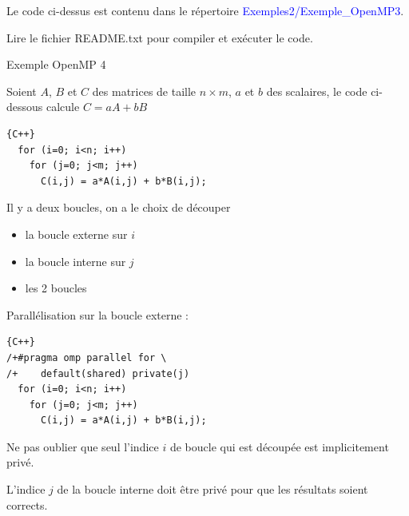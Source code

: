 \documentclass{beamer}
\begin{document}
\begin{frame}
	Le code ci-dessus est contenu dans le répertoire \textcolor{blue}{Exemples2/Exemple\_OpenMP3}.
	
	Lire le fichier README.txt pour compiler et exécuter le code.
		
\end{frame}

\begin{frame}[fragile]
	Exemple OpenMP 4
	
	\vfill	
	
	Soient $A$, $B$ et $C$ des matrices de taille $n\times m$, $a$ et $b$ des scalaires, le code ci-dessous calcule $C = a A + b B$
	
	\vfill

\begin{lstlisting}{C++}
  for (i=0; i<n; i++)
    for (j=0; j<m; j++)
      C(i,j) = a*A(i,j) + b*B(i,j);
\end{lstlisting}
	\vfill
	
	Il y a deux boucles, on a le choix de découper
	\begin{itemize}
		\item la boucle externe sur $i$
		\item la boucle interne sur $j$
		\item les 2 boucles
	\end{itemize}
\end{frame}

\begin{frame}[fragile]
Parallélisation sur la boucle externe :
	
	\begin{lstlisting}{C++}
/+#pragma omp parallel for \
/+    default(shared) private(j)
  for (i=0; i<n; i++)
    for (j=0; j<m; j++)
      C(i,j) = a*A(i,j) + b*B(i,j);
\end{lstlisting}
	\vfill
	Ne pas oublier que seul l'indice $i$ de boucle qui est découpée est implicitement privé.
	\bigskip
	
	L'indice $j$ de la boucle interne doit être privé pour que les résultats soient corrects.
	\vfill
\end{frame}
\end{document}
